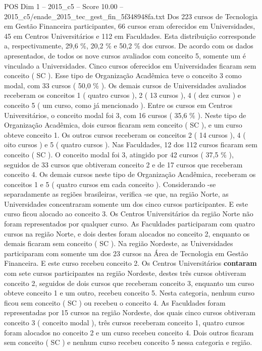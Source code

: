\begin{textsample}{POS Dim 1 – 2015\_c5 – Score 10.00 – 2015\_c5/enade\_2015\_tec\_gest\_fin\_5f348948fa.txt}
Dos 223 cursos de Tecnologia em Gestão Financeira participantes, 66 cursos eram oferecidos em Universidades, 45 em Centros Universitários e 112 em Faculdades.
Esta distribuição corresponde a, respectivamente, 29,6 \%, 20,2 \% e 50,2 \% dos cursos.
De acordo com os dados apresentados, de todos os nove cursos avaliados com conceito 5, somente um é vinculado a Universidades.
Cinco cursos oferecidos em Universidades ficaram sem conceito ( SC ).
Esse tipo de Organização Acadêmica teve o conceito 3 como modal, com 33 cursos ( 50,0 \% ).
Os demais cursos de Universidades avaliados receberam os conceitos 1 ( quatro cursos ), 2 ( 13 cursos ), 4 ( dez cursos ) e conceito 5 ( um curso, como já mencionado ).
Entre os cursos em Centros Universitários, o conceito modal foi 3, com 16 cursos ( 35,6 \% ).
Neste tipo de Organização Acadêmica, dois cursos ficaram sem conceito ( SC ), e um curso obteve conceito 1.
Os outros cursos receberam os conceitos 2 ( 14 cursos ), 4 ( oito cursos ) e 5 ( quatro cursos ).
Nas Faculdades, 12 dos 112 cursos ficaram sem conceito ( SC ).
O conceito modal foi 3, atingido por 42 cursos ( 37,5 \% ), seguidos de 33 cursos que obtiveram conceito 2 e de 17 cursos que receberam conceito 4.
Os demais cursos neste tipo de Organização Acadêmica, receberam os conceitos 1 e 5 ( quatro cursos em cada conceito ).
Considerando -se separadamente as regiões brasileiras, verifica -se que, na região Norte, as Universidades concentraram somente um dos cinco cursos participantes.
E este curso ficou alocado ao conceito 3.
Os Centros Universitários da região Norte não foram representados por qualquer curso.
As Faculdades participaram com quatro cursos na região Norte, e dois destes foram alocados no conceito 2, enquanto os demais ficaram sem conceito ( SC ).
Na região Nordeste, as Universidades participaram com somente um dos 23 cursos na Área de Tecnologia em Gestão Financeira.
E este curso recebeu conceito 2.
Os Centros Universitários \textbf{contaram} com sete cursos participantes na região Nordeste, destes três cursos obtiveram conceito 2, seguidos de dois cursos que receberam conceito 3, enquanto um curso obteve conceito 1 e um outro, recebeu conceito 5.
Nesta categoria, nenhum curso ficou sem conceito ( SC ) ou recebeu o conceito 4.
As Faculdades foram representadas por 15 cursos na região Nordeste, dos quais cinco cursos obtiveram conceito 3 ( conceito modal ), três cursos receberam conceito 1, quatro cursos foram alocados no conceito 2 e um curso recebeu conceito 4.
Dois outros ficaram sem conceito ( SC ) e nenhum curso recebeu conceito 5 nessa categoria e região.

\end{textsample}
